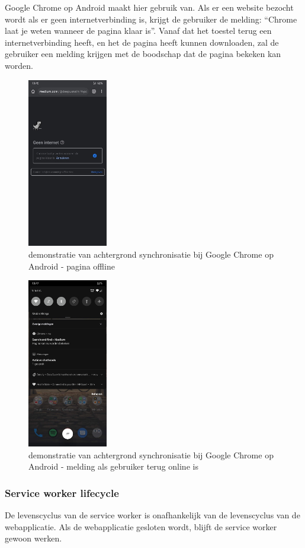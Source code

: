 		Google Chrome op Android maakt hier gebruik van. Als er een website bezocht wordt als er geen internetverbinding is, krijgt de gebruiker de melding: “Chrome laat je weten wanneer de pagina klaar is”. Vanaf dat het toestel terug een internetverbinding heeft, en het de pagina heeft kunnen downloaden,  zal de gebruiker een melding krijgen met de boodschap dat de pagina bekeken kan worden.
	
	
		\begin{figure}[H]
			\centering
			\includegraphics[width=35mm]{./img/backSync1.png}{}
			\caption{demonstratie van achtergrond synchronisatie bij Google Chrome op Android - pagina offline}
		\end{figure}
		
		\begin{figure}[H]
			\centering
			\includegraphics[width=35mm]{./img/backSync2.png}
			\caption{demonstratie van achtergrond synchronisatie bij Google Chrome op Android - melding als gebruiker terug online is}
		\end{figure}
		\subsubsection{Service worker lifecycle }
			De levenscyclus van de service worker is onafhankelijk van de levenscyclus van de webapplicatie. Als de webapplicatie gesloten wordt, blijft de service worker gewoon werken.
			
